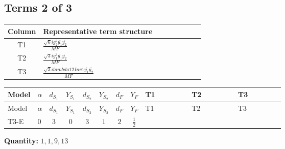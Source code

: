 \documentclass[8pt]{article}
\begin{document}
\begin{landscape}
\subsection*{Terms 2 of 3}
\begin{center}
\begin{tabular}{@{}c >{\raggedright\arraybackslash}p{0.82\linewidth}@{}}
\toprule
Column & Representative term structure \\
\midrule
T1 & \(\displaystyle \frac{\sqrt{6} i g_{2}^{2} \overline{y_{1}} \overline{y_{2}}}{MF}\) \\
\midrule
T2 & \(\displaystyle \frac{\sqrt{3} i g_{1}^{2} \overline{y_{1}} \overline{y_{2}}}{MF}\) \\
\midrule
T3 & \(\displaystyle \frac{\sqrt{3} i lambda12Inv1 \overline{y_{1}} \overline{y_{2}}}{MF}\) \\
\midrule
\bottomrule
\end{tabular}
\end{center}
\smallskip
\tiny
\begin{longtable}{@{}llcccccc >{\raggedright\arraybackslash}p{0.21\linewidth} >{\raggedright\arraybackslash}p{0.21\linewidth} >{\raggedright\arraybackslash}p{0.21\linewidth}@{}}
\toprule
Model & $\alpha$ & $d_{S_1}$ & $Y_{S_1}$ & $d_{S_2}$ & $Y_{S_2}$ & $d_F$ & $Y_F$ & T1 & T2 & T3 \\
\midrule
\endfirsthead
\toprule
Model & $\alpha$ & $d_{S_1}$ & $Y_{S_1}$ & $d_{S_2}$ & $Y_{S_2}$ & $d_F$ & $Y_F$ & T1 & T2 & T3 \\
\midrule
\endhead
T3-E & $0$ & $3$ & $0$ & $3$ & $1$ & $2$ & $\frac{1}{2}$ & \scriptsize\adjustbox{max width=\linewidth}{$\begin{gathered} - \frac{\sqrt{6} i g_{2}^{2} \overline{y_{1}} \overline{y_{2}}}{3 MF}\end{gathered}$} & \scriptsize\adjustbox{max width=\linewidth}{$\begin{gathered} - \frac{\sqrt{3} i g_{1}^{2} \overline{y_{1}} \overline{y_{2}}}{8 MF}\end{gathered}$} & \scriptsize\adjustbox{max width=\linewidth}{$\begin{gathered} \frac{\sqrt{3} i lambda12Inv1 \overline{y_{1}} \overline{y_{2}}}{6 MF}\end{gathered}$} \\
\midrule
\bottomrule
\end{longtable}
\clearpage
\noindent\textbf{Quantity: }$\mathrm{1,1,9,13}$\par\smallskip

\end{landscape}
\end{document}
